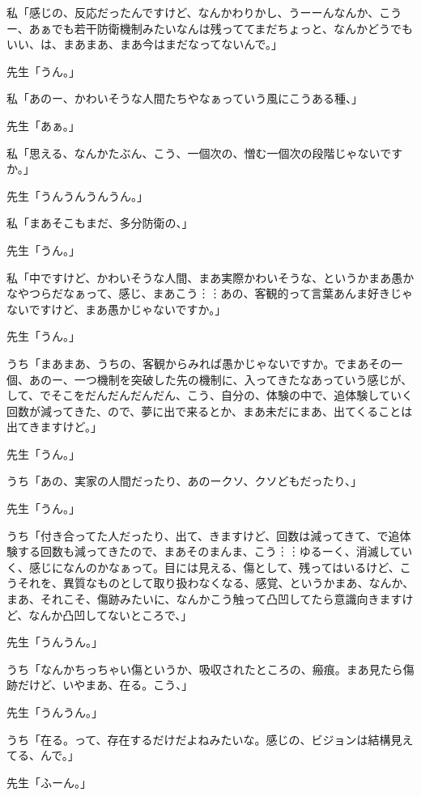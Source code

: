 \documentclass[b5j,twoside,twocolumn]{utarticle}
\begin{document}
\begin{description}
\item 私「感じの、反応だったんですけど、なんかわりかし、うーーんなんか、こうー、あぁでも若干防衛機制みたいなんは残っててまだちょっと、なんかどうでもいい、は、まあまあ、まあ今はまだなってないんで。」
\item 先生「うん。」
\item 私「あのー、かわいそうな人間たちやなぁっていう風にこうある種、」
\item 先生「あぁ。」
\item 私「思える、なんかたぶん、こう、一個次の、憎む一個次の段階じゃないですか。」
\item 先生「うんうんうんうん。」
\item 私「まあそこもまだ、多分防衛の、」
\item 先生「うん。」
\item 私「中ですけど、かわいそうな人間、まあ実際かわいそうな、というかまあ愚かなやつらだなぁって、感じ、まあこう︙︙あの、客観的って言葉あんま好きじゃないですけど、まあ愚かじゃないですか。」
\item 先生「うん。」
\item うち「まあまあ、うちの、客観からみれば愚かじゃないですか。でまあその一個、あのー、一つ機制を突破した先の機制に、入ってきたなあっていう感じが、して、でそこをだんだんだんだん、こう、自分の、体験の中で、追体験していく回数が減ってきた、ので、夢に出で来るとか、まあ未だにまあ、出てくることは出てきますけど。」
\item 先生「うん。」
\item うち「あの、実家の人間だったり、あのークソ、クソどもだったり、」
\item 先生「うん。」
\item うち「付き合ってた人だったり、出て、きますけど、回数は減ってきて、で追体験する回数も減ってきたので、まあそのまんま、こう︙︙ゆるーく、消滅していく、感じになんのかなぁって。目には見える、傷として、残ってはいるけど、こうそれを、異質なものとして取り扱わなくなる、感覚、というかまあ、なんか、まあ、それこそ、傷跡みたいに、なんかこう触って凸凹してたら意識向きますけど、なんか凸凹してないところで、」
\item 先生「うんうん。」
\item うち「なんかちっちゃい傷というか、吸収されたところの、瘢痕。まあ見たら傷跡だけど、いやまあ、在る。こう、」
\item 先生「うんうん。」
\item うち「在る。って、存在するだけだよねみたいな。感じの、ビジョンは結構見えてる、んで。」
\item 先生「ふーん。」

\end{description}
\end{document}
